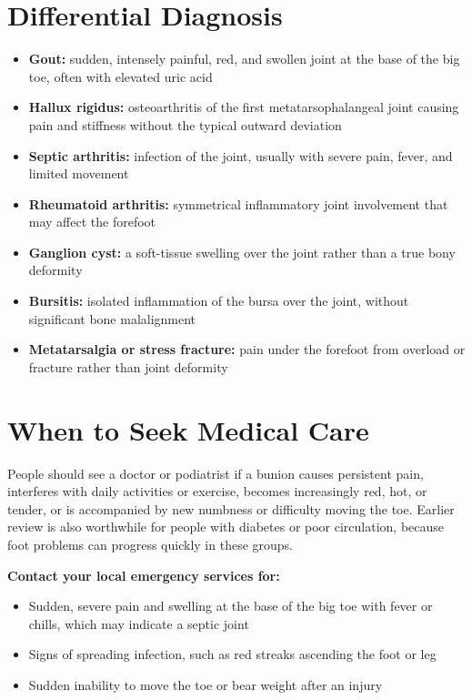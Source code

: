 \section*{Differential Diagnosis}
\begin{itemize}
    \item \textbf{Gout:} sudden, intensely painful, red, and swollen joint at the base of the big toe, often with elevated uric acid
    \item \textbf{Hallux rigidus:} osteoarthritis of the first metatarsophalangeal joint causing pain and stiffness without the typical outward deviation
    \item \textbf{Septic arthritis:} infection of the joint, usually with severe pain, fever, and limited movement
    \item \textbf{Rheumatoid arthritis:} symmetrical inflammatory joint involvement that may affect the forefoot
    \item \textbf{Ganglion cyst:} a soft-tissue swelling over the joint rather than a true bony deformity
    \item \textbf{Bursitis:} isolated inflammation of the bursa over the joint, without significant bone malalignment
    \item \textbf{Metatarsalgia or stress fracture:} pain under the forefoot from overload or fracture rather than joint deformity
\end{itemize}

\section*{When to Seek Medical Care}
People should see a doctor or podiatrist if a bunion causes persistent pain, interferes with daily activities or exercise, becomes increasingly red, hot, or tender, or is accompanied by new numbness or difficulty moving the toe. Earlier review is also worthwhile for people with diabetes or poor circulation, because foot problems can progress quickly in these groups.

\textbf{Contact your local emergency services for:}
\begin{itemize}
    \item Sudden, severe pain and swelling at the base of the big toe with fever or chills, which may indicate a septic joint
    \item Signs of spreading infection, such as red streaks ascending the foot or leg
    \item Sudden inability to move the toe or bear weight after an injury
\end{itemize}

